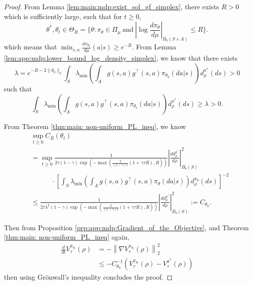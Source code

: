 \documentclass{amsart}
\theoremstyle{definition}
\begin{document}
\begin{proof}
From Lemma \ref{lem:main:mdp:exist_sol_gf_simplex}, there exists $R >0$ which is sufficiently large, such that for $t \geq 0$, 
\[
\theta^*, \theta_t \in \Theta_{R} = \{\theta: \pi_\theta \in \Pi_\mu \ \text{and}\  |\log \frac{d \pi_\theta}{d\mu}|_{B_b(S\times A)} \leq R \}.
\]
which means that $\min_{s,a}\frac{d \pi_{\theta_t}}{d \mu}(a|s) \geq e^{-R}$.
From Lemma \ref{lem:app:mdp:lower_bound_log_density_simplex}, we know that there exists 
\begin{equation}\label{eq:positive_lambda_simplex}
\lambda = e^{-R-2\|\theta_0\|_2}  \int_{S} \lambda_{\min}\left(\int_{A} g(s,a)g^\top(s,a)\pi_{\theta_0} (da | s)\right) d_\rho^{\pi^*}(ds) >0
\end{equation}
such that 
\[
\int_{S} \lambda_{\min} (\int_{A} g(s,a)g^\top(s,a)\pi_{\theta_t} (da | s))d_\rho^{\pi^*}(ds) \geq \lambda >0.
\]

From Theorem \ref{thm:main: non-uniform_PL_ineq}, we know
\begin{align*}
& \sup_{t \geq 0} C_R(\theta_t) \nonumber\\
& = \sup_{t \geq 0} \frac{1}{2\tau (1-\gamma) \exp\left({-\max\left(\frac{2}{(1-\gamma)\tau} \left(1+\gamma\tau R\right), R\right)}\right)}\left|\frac{d d_\rho^{\pi^*}}{ d \rho}\right|^2_{B_b(S)} \\
& \quad \quad \quad \cdot\left[\int_{S}\lambda_{\min}\left(\int_{A} g(s,a)g^\top(s,a)\pi_\theta(da|s)\right)d^{\pi_{\theta}}_{\rho}(ds)\right]^{-2}\\
& \leq \frac{1}{2\tau \lambda^2 (1-\gamma) \exp\left({-\max\left(\frac{2}{(1-\gamma)\tau} \left(1+\gamma\tau R\right), R\right)}\right)}\left|\frac{d d_\rho^{\pi^*}}{ d \rho}\right|^2_{B_b(S)} := C_{\theta_0}.
\end{align*}

Then from Proposition \ref{prp:app:mdp:Gradient_of_the_Objective}, and Theorem \ref{thm:main: non-uniform_PL_ineq} again,
\begin{align*}
\frac{d}{dt} V_\tau^{\pi_{\theta_t}}(\rho) &= - \left\|\nabla V_\tau^{\pi_{\theta_t}}(\rho)\right\|^2_2\\
& \leq -C_{\theta_0}^{-1} \left(V_\tau^{\pi_{\theta_t}}(\rho) - V_\tau^{\pi^*}  (\rho) \right)
\end{align*}
then using Grönwall's inequality concludes the proof.
\end{proof}
\end{document}
